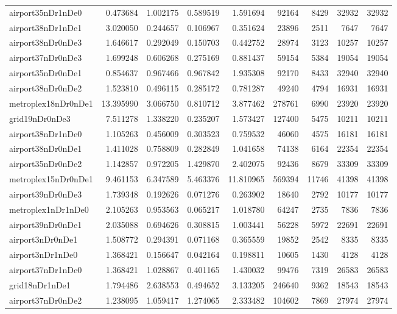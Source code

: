 \begin{longtable}{|l|r|r|r|r|r|r|r|r|}
airport35nDr1nDe0 & 0.473684 & 1.002175 & 0.589519 & 1.591694 & 92164 & 8429 & 32932 & 32932 \\
airport38nDr1nDe1 & 3.020050 & 0.244657 & 0.106967 & 0.351624 & 23896 & 2511 & 7647 & 7647 \\
airport38nDr0nDe3 & 1.646617 & 0.292049 & 0.150703 & 0.442752 & 28974 & 3123 & 10257 & 10257 \\
airport37nDr0nDe3 & 1.699248 & 0.606268 & 0.275169 & 0.881437 & 59154 & 5384 & 19054 & 19054 \\
airport35nDr0nDe1 & 0.854637 & 0.967466 & 0.967842 & 1.935308 & 92170 & 8433 & 32940 & 32940 \\
airport38nDr0nDe2 & 1.523810 & 0.496115 & 0.285172 & 0.781287 & 49240 & 4794 & 16931 & 16931 \\
metroplex18nDr0nDe1 & 13.395990 & 3.066750 & 0.810712 & 3.877462 & 278761 & 6990 & 23920 & 23920 \\
grid19nDr0nDe3 & 7.511278 & 1.338220 & 0.235207 & 1.573427 & 127400 & 5475 & 10211 & 10211 \\
airport38nDr1nDe0 & 1.105263 & 0.456009 & 0.303523 & 0.759532 & 46060 & 4575 & 16181 & 16181 \\
airport38nDr0nDe1 & 1.411028 & 0.758809 & 0.282849 & 1.041658 & 74138 & 6164 & 22354 & 22354 \\
airport35nDr0nDe2 & 1.142857 & 0.972205 & 1.429870 & 2.402075 & 92436 & 8679 & 33309 & 33309 \\
metroplex15nDr0nDe1 & 9.461153 & 6.347589 & 5.463376 & 11.810965 & 569394 & 11746 & 41398 & 41398 \\
airport39nDr0nDe3 & 1.739348 & 0.192626 & 0.071276 & 0.263902 & 18640 & 2792 & 10177 & 10177 \\
metroplex1nDr1nDe0 & 2.105263 & 0.953563 & 0.065217 & 1.018780 & 64247 & 2735 & 7836 & 7836 \\
airport39nDr0nDe1 & 2.035088 & 0.694626 & 0.308815 & 1.003441 & 56228 & 5972 & 22691 & 22691 \\
airport3nDr0nDe1 & 1.508772 & 0.294391 & 0.071168 & 0.365559 & 19852 & 2542 & 8335 & 8335 \\
airport3nDr1nDe0 & 1.368421 & 0.156647 & 0.042164 & 0.198811 & 10605 & 1430 & 4128 & 4128 \\
airport37nDr1nDe0 & 1.368421 & 1.028867 & 0.401165 & 1.430032 & 99476 & 7319 & 26583 & 26583 \\
grid18nDr1nDe1 & 1.794486 & 2.638553 & 0.494652 & 3.133205 & 246640 & 9362 & 18543 & 18543 \\
airport37nDr0nDe2 & 1.238095 & 1.059417 & 1.274065 & 2.333482 & 104602 & 7869 & 27974 & 27974 \\

\end{longtable}
